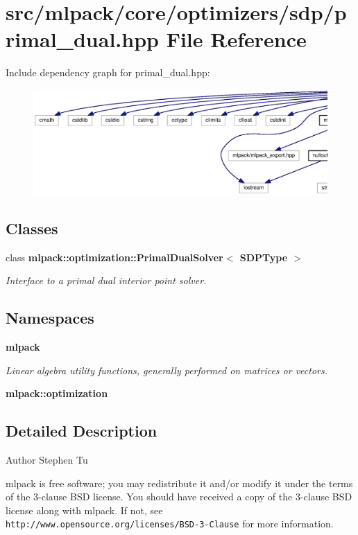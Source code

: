 \section{src/mlpack/core/optimizers/sdp/primal\+\_\+dual.hpp File Reference}
\label{primal__dual_8hpp}
Include dependency graph for primal\+\_\+dual.\+hpp\+:
\nopagebreak
\begin{figure}[H]
\begin{center}
\leavevmode
\includegraphics[width=350pt]{primal__dual_8hpp__incl}
\end{center}
\end{figure}
\subsection*{Classes}
\begin{DoxyCompactItemize}
\item 
class {\bf mlpack\+::optimization\+::\+Primal\+Dual\+Solver$<$ S\+D\+P\+Type $>$}
\begin{DoxyCompactList}\small\item\em Interface to a primal dual interior point solver. \end{DoxyCompactList}\end{DoxyCompactItemize}
\subsection*{Namespaces}
\begin{DoxyCompactItemize}
\item 
 {\bf mlpack}
\begin{DoxyCompactList}\small\item\em Linear algebra utility functions, generally performed on matrices or vectors. \end{DoxyCompactList}\item 
 {\bf mlpack\+::optimization}
\end{DoxyCompactItemize}


\subsection{Detailed Description}
\begin{DoxyAuthor}{Author}
Stephen Tu
\end{DoxyAuthor}
mlpack is free software; you may redistribute it and/or modify it under the terms of the 3-\/clause B\+SD license. You should have received a copy of the 3-\/clause B\+SD license along with mlpack. If not, see {\tt http\+://www.\+opensource.\+org/licenses/\+B\+S\+D-\/3-\/\+Clause} for more information. 